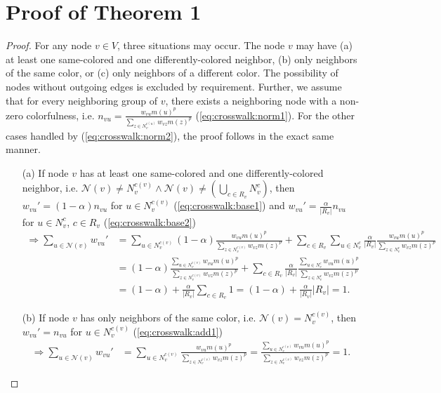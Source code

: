 \clearpage
\section{Proof of Theorem 1}
\label{sec:proof}
\begin{proof}
For any node $v \in V$, three situations may occur. The node $v$ may have (a) at least one same-colored and one differently-colored neighbor, (b) only neighbors of the same color, or (c) only neighbors of a different color. The possibility of nodes without outgoing edges is excluded by requirement. Further, we assume that for every neighboring group of $v$, there exists a neighboring node with a non-zero colorfulness, i.e. $n_{vu} = \frac{w_{vu} m(u)^p}{\sum_{z \in N_v^{c(u)}} w_{vz} m(z)^p}$ (\autoref{eq:crosswalk:norm1}). For the other cases handled by (\autoref{eq:crosswalk:norm2}), the proof follows in the exact same manner.
\begin{enumerate}
    \item[(a)] If node $v$ has at least one same-colored and one differently-colored neighbor, i.e. $\mathcal{N}(v) \neq N_v^{c(v)} \wedge \mathcal{N}(v) \neq \left( \bigcup_{c \in R_v} N_v^{c} \right)$, then $w_{vu}' = (1-\alpha) n_{vu}$ for $u \in N_v^{c(v)}$ (\autoref{eq:crosswalk:base1}) and $w_{vu}' = \frac{\alpha}{|R_v|} n_{vu}$ for $u \in N_v^c$, $c \in R_v$ (\autoref{eq:crosswalk:base2})
    \begin{align*}
         \Rightarrow \sum_{u \in \mathcal{N}(v)} w_{vu}' &= \sum_{u \in N_v^{c(v)}} (1-\alpha) \frac{w_{vu} m(u)^p}{\sum_{z \in N_v^{c(v)}} w_{vz} m(z)^p} + \sum_{c \in R_v} \sum_{u \in N_v^c} \frac{\alpha}{|R_v|} \frac{w_{vu} m(u)^p}{\sum_{z \in N_v^c} w_{vz} m(z)^p} \\
         &= (1-\alpha) \frac{\sum_{u \in N_v^{c(v)}} w_{vu} m(u)^p}{\sum_{z \in N_v^{c(v)}} w_{vz} m(z)^p} + \sum_{c \in R_v} \frac{\alpha}{|R_v|} \frac{\sum_{u \in N_v^c} w_{vu} m(u)^p}{\sum_{z \in N_v^c} w_{vz} m(z)^p} \\
         &= (1 - \alpha) + \frac{\alpha}{|R_v|} \sum_{c \in R_v} 1 = (1 - \alpha) + \frac{\alpha}{|R_v|} |R_v| = 1.
    \end{align*}
    \item[(b)] If node $v$ has only neighbors of the same color, i.e. $\mathcal{N}(v) = N_v^{c(v)}$, then $w_{vu}' = n_{vu}$ for $u \in N_v^{c(v)}$ (\autoref{eq:crosswalk:add1})
    \begin{align*}
         \Rightarrow \sum_{u \in \mathcal{N}(v)} w_{vu}' &= \sum_{u \in N_v^{c(v)}} \frac{w_{vu} m(u)^p}{\sum_{z \in N_v^{c(v)}} w_{vz} m(z)^p} = \frac{\sum_{u \in N_v^{c(v)}} w_{vu} m(u)^p}{\sum_{z \in N_v^{c(v)}} w_{vz} m(z)^p} = 1.

\end{align*}
\end{enumerate}
\end{proof}
